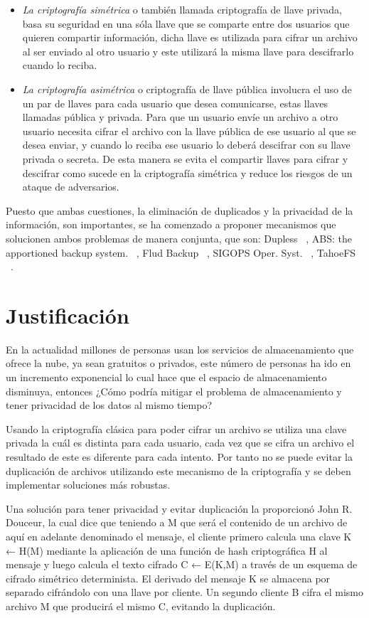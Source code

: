 \begin{itemize} 
   \item \textit{La criptografía simétrica} o también llamada criptografía de llave privada, basa su seguridad en una sóla llave que se comparte entre dos usuarios que quieren compartir información, dicha llave es utilizada para cifrar un archivo al ser enviado al otro usuario y este utilizará la misma llave para descifrarlo cuando lo reciba. 
\item \textit{La criptografía asimétrica} o criptografía de llave pública involucra el uso de un par de llaves para cada usuario que desea comunicarse, estas llaves llamadas pública y privada. Para que un usuario envíe un archivo a otro usuario necesita cifrar el archivo con la llave pública de ese usuario al que se desea enviar, y cuando lo reciba ese usuario lo deberá descifrar con su llave privada o secreta. De esta manera se evita el compartir llaves para cifrar y descifrar como sucede en la criptografía simétrica y reduce los riesgos de un ataque de adversarios. 
 \end{itemize}

Puesto que ambas cuestiones, la eliminación de duplicados y la privacidad de la información, son importantes, se ha comenzado a
proponer mecanismos que solucionen ambos problemas de manera conjunta, que son: Dupless ~\cite{Bellare}, ABS: the apportioned backup
system. ~\cite{abs}, Flud Backup ~\cite{flud}, SIGOPS Oper. Syst. ~\cite{sigops}, TahoeFS ~\cite{tahoe}.

\section{Justificación}

En la actualidad millones de personas usan los servicios de almacenamiento que ofrece la nube, ya sean gratuitos o privados, este número de personas ha ido en un incremento exponencial lo cual hace que el espacio de almacenamiento disminuya, entonces ¿Cómo podría mitigar el problema de almacenamiento y tener privacidad de los datos al mismo tiempo?

Usando la criptografía clásica para poder cifrar un archivo se utiliza una clave privada la cuál es distinta para cada usuario, cada vez que se cifra un archivo el resultado de este es diferente para cada intento. Por tanto no se puede evitar la duplicación de archivos utilizando este mecanismo de la criptografía y se deben implementar soluciones más robustas.

Una solución para tener privacidad y evitar duplicación la proporcionó John R. Douceur, la cual dice que teniendo a M que será el contenido de un archivo de aquí en adelante denominado el mensaje, el cliente primero calcula una clave K ← H(M) mediante la aplicación de una función de hash criptográfica H al mensaje y luego calcula el texto cifrado C ← E(K,M) a través de un esquema de cifrado simétrico determinista. El derivado del mensaje K se almacena por separado cifrándolo con una llave por cliente. Un segundo cliente B cifra el mismo archivo M que producirá el mismo C, evitando la duplicación. ~\cite{donceur}

